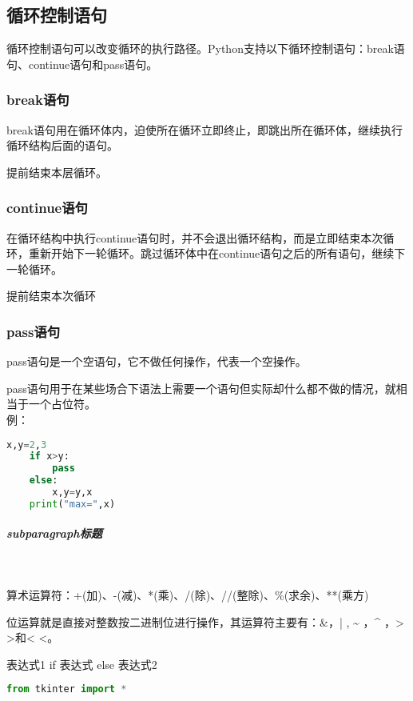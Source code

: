 \documentclass[11pt,a4paper]{article}
\begin{document}
\subsection{循环控制语句}

循环控制语句可以改变循环的执行路径。Python支持以下循环控制语句：break语句、continue语句和pass语句。

\subsubsection{break语句}

break语句用在循环体内，迫使所在循环立即终止，即跳出所在循环体，继续执行循环结构后面的语句。

提前结束本层循环。

\subsubsection{continue语句}

在循环结构中执行continue语句时，并不会退出循环结构，而是立即结束本次循环，重新开始下一轮循环。跳过循环体中在continue语句之后的所有语句，继续下一轮循环。

提前结束本次循环

\subsubsection{pass语句}

pass语句是一个空语句，它不做任何操作，代表一个空操作。

pass语句用于在某些场合下语法上需要一个语句但实际却什么都不做的情况，就相当于一个占位符。\\
例：
\begin{lstlisting}[language={Python}]
    x,y=2,3
    if x>y:
        pass
    else:
        x,y=y,x
    print("max=",x)
\end{lstlisting}



\subparagraph{subparagraph标题}~{}

算术运算符：+(加)、-(减)、*(乘)、/(除)、//(整除)、\%(求余)、**(乘方)

位运算就是直接对整数按二进制位进行操作，其运算符主要有：\&，| , \~{} ，\^{} ，> >和< <。

\begin{center}
    表达式1 if 表达式 else 表达式2
\end{center}

\begin{lstlisting}[language={Python}]
    from tkinter import *
\end{lstlisting}
\end{document}
